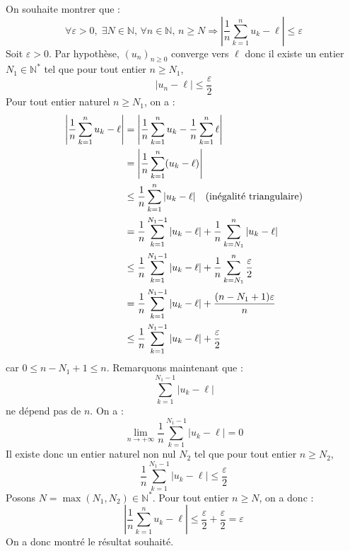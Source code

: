 \documentclass[a4paper,10pt]{report}
\begin{document}
\corr On souhaite montrer que :
$$ \forall \varepsilon>0, \; \exists N \in \mathbb{N}, \, \forall n \in \mathbb{N}, \, n \geq N \Longrightarrow \left\vert \frac{1}{n} \sum_{k=1}^n u_k - \ell \right\vert \leq \varepsilon$$
Soit $\varepsilon>0$. Par hypothèse, $(u_n)_{n \geq 0}$ converge vers $\ell$ donc il existe un entier $N_1 \in \mathbb{N}^*$ tel que pour tout entier $n \geq N_1$,
$$ \vert u_n - \ell \vert \leq \dfrac{\varepsilon}{2}$$
Pour tout entier naturel $n \geq N_1$, on a :
\begin{align*}
\left\vert \frac{1}{n} \sum_{k=1}^n u_k - \ell \right\vert & = \left\vert \frac{1}{n} \sum_{k=1}^n u_k - \frac{1}{n} \sum_{k=1}^n \ell \right\vert \\
& = \left\vert \frac{1}{n} \sum_{k=1}^n (u_k - \ell) \right\vert \\
& \leq \dfrac{1}{n} \sum_{k=1}^n \vert u_k - \ell \vert  \quad \hbox{(inégalité triangulaire)} \\
& = \dfrac{1}{n} \sum_{k=1}^{N_1-1} \vert u_k - \ell \vert + \dfrac{1}{n} \sum_{k=N_1}^n \vert u_k - \ell \vert \\
& \leq \dfrac{1}{n} \sum_{k=1}^{N_1-1} \vert u_k - \ell \vert + \dfrac{1}{n} \sum_{k=N_1}^n \dfrac{\varepsilon}{2} \\
& = \dfrac{1}{n} \sum_{k=1}^{N_1-1} \vert u_k - \ell \vert + \dfrac{(n-N_1+1) \varepsilon}{n}  \\
& \leq  \dfrac{1}{n} \sum_{k=1}^{N_1-1} \vert u_k - \ell \vert +\dfrac{\varepsilon}{2} \\
\end{align*}
car $0 \leq n-N_1+1 \leq n$. Remarquons maintenant que :
$$\sum_{k=1}^{N_1-1} \vert u_k - \ell \vert$$
ne dépend pas de $n$. On a :
$$ \lim_{n \rightarrow + \infty} \dfrac{1}{n} \sum_{k=1}^{N_1-1} \vert u_k - \ell \vert = 0$$
Il existe donc un entier naturel non nul $N_2$ tel que pour tout entier $n \geq N_2$,
$$ \dfrac{1}{n} \sum_{k=1}^{N_1-1} \vert u_k - \ell \vert \leq \dfrac{\varepsilon}{2}$$
Posons $N= \max(N_1, N_2) \in \mathbb{N}^*$. Pour tout entier $n \geq N$, on a donc :
$$ \left\vert \frac{1}{n} \sum_{k=1}^n u_k - \ell \right\vert \leq \dfrac{\varepsilon}{2} +  \dfrac{\varepsilon}{2} = \varepsilon$$
On a donc montré le résultat souhaité. 
\end{document}
